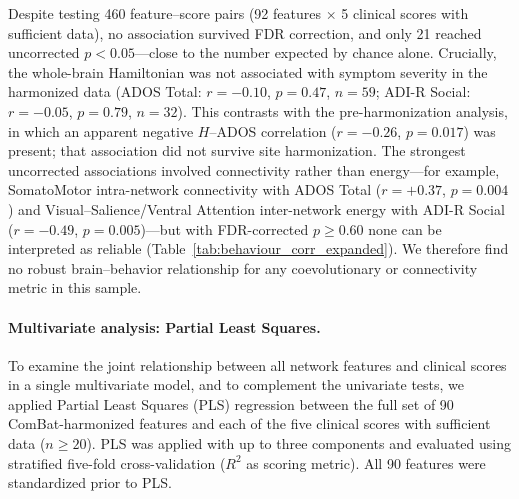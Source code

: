 \documentclass[10pt,letterpaper]{article}
\begin{document}
Despite testing 460 feature--score pairs (92 features $\times$ 5 clinical scores with sufficient
data), no association survived FDR correction, and only 21 reached uncorrected $p < 0.05$---close to
the number expected by chance alone. Crucially, the whole-brain Hamiltonian was not associated with
symptom severity in the harmonized data (ADOS Total: $r = -0.10$, $p = 0.47$, $n = 59$; ADI-R Social:
$r = -0.05$, $p = 0.79$, $n = 32$). This contrasts with the pre-harmonization analysis, in which an
apparent negative $H$--ADOS correlation ($r = -0.26$, $p = 0.017$) was present; that association did
not survive site harmonization. The strongest uncorrected associations involved connectivity rather
than energy---for example, SomatoMotor intra-network connectivity with ADOS Total ($r = +0.37$,
$p = 0.004$) and Visual--Salience/Ventral Attention inter-network energy with ADI-R Social
($r = -0.49$, $p = 0.005$)---but with FDR-corrected $p \geq 0.60$ none can be interpreted as reliable
(Table~\ref{tab:behaviour_corr_expanded}). We therefore find no robust brain--behavior relationship
for any coevolutionary or connectivity metric in this sample.

\paragraph*{Multivariate analysis: Partial Least Squares.}
To examine the joint relationship between all network features and clinical scores in a single
multivariate model, and to complement the univariate tests, we applied Partial Least Squares (PLS)
regression \cite{Krishnan2011} between the full set of 90 ComBat-harmonized features and each of
the five clinical scores with sufficient data ($n \geq 20$). PLS was applied with up to three
components and evaluated using stratified five-fold cross-validation ($R^2$ as scoring metric).
All 90 features were standardized prior to PLS.
\end{document}
